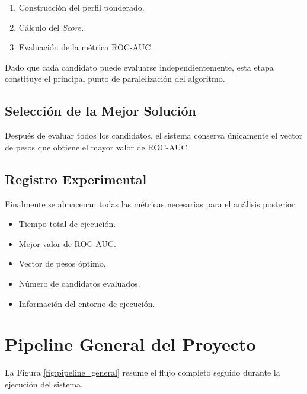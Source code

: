 \begin{enumerate}

\item Construcción del perfil ponderado.

\item Cálculo del \textit{Score}.

\item Evaluación de la métrica ROC-AUC.

\end{enumerate}

Dado que cada candidato puede evaluarse independientemente, esta etapa constituye el principal punto de paralelización del algoritmo.

\subsection{Selección de la Mejor Solución}

Después de evaluar todos los candidatos, el sistema conserva únicamente el vector de pesos que obtiene el mayor valor de ROC-AUC.

\subsection{Registro Experimental}

Finalmente se almacenan todas las métricas necesarias para el análisis posterior:

\begin{itemize}

\item Tiempo total de ejecución.

\item Mejor valor de ROC-AUC.

\item Vector de pesos óptimo.

\item Número de candidatos evaluados.

\item Información del entorno de ejecución.

\end{itemize}

\section{Pipeline General del Proyecto}

La Figura \ref{fig:pipeline_general} resume el flujo completo seguido durante la ejecución del sistema.

